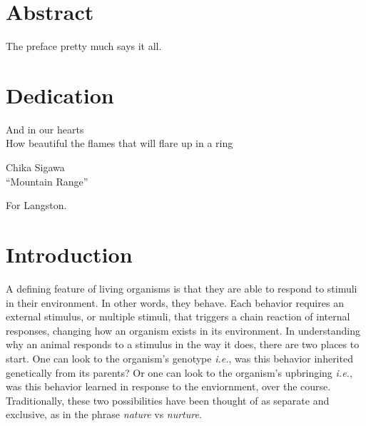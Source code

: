 \documentclass[12pt,twoside]{reedthesis}
\begin{document}
    \chapter*{Abstract}
	The preface pretty much says it all.
	
	\chapter*{Dedication}
  \epigraph{And in our hearts\\ How beautiful the flames that will flare up in a
    ring}{Chika Sigawa \\ ``Mountain Range''}
For Langston.
  \mainmatter %
  \pagestyle{fancyplain} %


    \chapter*{Introduction}

 \onehalfspacing
		
A defining feature of living organisms is that they are able to respond to
stimuli in their environment. In other words, they behave. Each behavior
requires an external stimulus, or multiple stimuli, that triggers a chain
reaction of internal responses, changing how an organism exists in its environment. In understanding why an animal responds to a stimulus in the way it does, there
are two places to start. One can look to the organism's genotype \textit{i.e.},
was this behavior inherited genetically from its parents? Or one can look to the
organism's upbringing \textit{i.e.}, was this behavior learned in response to
the enviornment, over the course. Traditionally, these two possibilities have been thought of as
separate and exclusive, as in the phrase \textit{nature} vs \textit{nurture}.  
\end{document}
